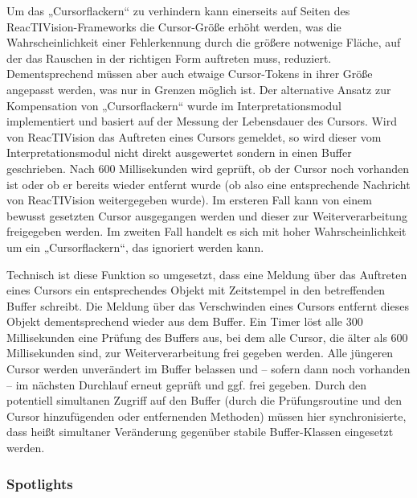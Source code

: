 Um das „Cursorflackern“ zu verhindern kann einerseits auf Seiten des ReacTIVision-Frameworks die Cursor-Größe erhöht werden, was die Wahrscheinlichkeit einer Fehlerkennung durch die größere notwenige Fläche, auf der das Rauschen in der richtigen Form auftreten muss, reduziert. Dementsprechend müssen aber auch etwaige Cursor-Tokens in ihrer Größe angepasst werden, was nur in Grenzen möglich ist. Der alternative Ansatz zur Kompensation von „Cursorflackern“ wurde im Interpretationsmodul implementiert und basiert auf der Messung der Lebensdauer des Cursors. Wird von ReacTIVision das Auftreten eines Cursors gemeldet, so wird dieser vom Interpretationsmodul nicht direkt ausgewertet sondern in einen Buffer geschrieben. Nach 600 Millisekunden wird geprüft, ob der Cursor noch vorhanden ist oder ob er bereits wieder entfernt wurde (ob also eine entsprechende Nachricht von ReacTIVision weitergegeben wurde). Im ersteren Fall kann von einem bewusst gesetzten Cursor ausgegangen werden und dieser zur Weiterverarbeitung freigegeben werden. Im zweiten Fall handelt es sich mit hoher Wahrscheinlichkeit um ein „Cursorflackern“, das ignoriert werden kann. 

Technisch ist diese Funktion so umgesetzt, dass eine Meldung über das Auftreten eines Cursors ein entsprechendes Objekt mit Zeitstempel in den betreffenden Buffer schreibt. Die Meldung über das Verschwinden eines Cursors entfernt dieses Objekt dementsprechend wieder aus dem Buffer. Ein Timer löst alle 300 Millisekunden eine Prüfung des Buffers aus, bei dem alle Cursor, die älter als 600 Millisekunden sind, zur Weiterverarbeitung frei gegeben werden. Alle jüngeren Cursor werden unverändert im Buffer belassen und -- sofern dann noch vorhanden -- im nächsten Durchlauf erneut geprüft und ggf. frei gegeben. Durch den potentiell simultanen Zugriff auf den Buffer (durch die Prüfungsroutine und den Cursor hinzufügenden oder entfernenden Methoden) müssen hier synchronisierte, dass heißt simultaner Veränderung gegenüber stabile Buffer-Klassen eingesetzt werden.


\subsubsection{Spotlights} %
\label{ssub:spotlights}

